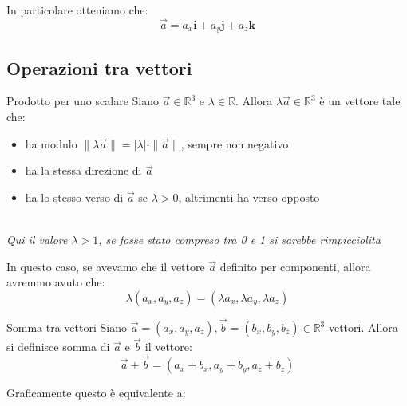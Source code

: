 \documentclass[11pt,a4paper,twoside]{article}
\theoremstyle{definition}
\begin{document}
In  particolare otteniamo che:
\[
	\vec a = a_x \mathbf{i} + a_y \mathbf j + a_z \mathbf k
\]

\subsection{Operazioni tra vettori}

\begin{defn}{Prodotto per uno scalare}{}
	Siano $\vec a \in \mathbb R^3$ e $\lambda \in \mathbb R$. Allora $\lambda \vec a \in \mathbb R^3$ è un vettore tale che:
	\begin{itemize}
		\item ha modulo $\|\lambda \vec a \| = |\lambda| \cdot \|\vec a\|$, sempre non negativo
		\item ha la stessa direzione di $\vec a$
		\item ha lo stesso verso di $\vec a$ se $\lambda>0$, altrimenti ha verso opposto
	\end{itemize}
\end{defn}

\begin{center}
	\\
	\textit{Qui il valore $\lambda>1$, se fosse stato compreso tra 0 e 1 si sarebbe rimpicciolita}
\end{center}

In questo caso, se avevamo che il vettore $\vec a$ definito per componenti, allora avremmo avuto che:
\[
	\lambda (a_x, a_y, a_z) = (\lambda a_x, \lambda a_y, \lambda a_z)
\]

\begin{defn}{Somma tra vettori}{}
	Siano $\vec a = (a_x, a_y, a_z), \vec b = (b_x, b_y, b_z) \in \mathbb R^3$ vettori. Allora si definisce somma di $\vec a$ e $\vec b$ il vettore:
	\[
		\vec a + \vec b = (a_x + b_x, a_y + b_y, a_z + b_z)
	\]
\end{defn}

Graficamente questo è equivalente a:

\begin{center}
\end{center}
\end{document}
